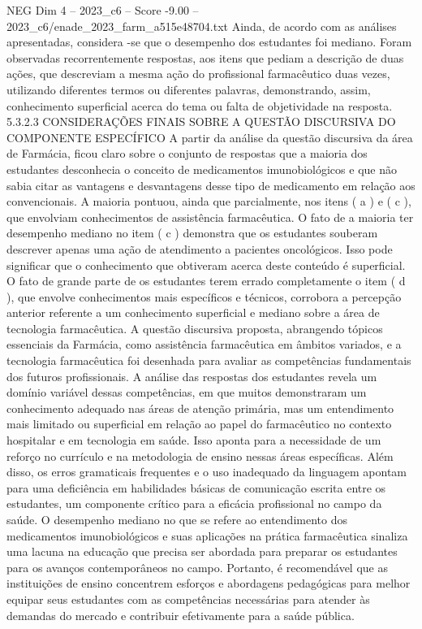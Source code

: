 \begin{textsample}{NEG Dim 4 – 2023\_c6 – Score -9.00 – 2023\_c6/enade\_2023\_farm\_a515e48704.txt}
Ainda, de acordo com as análises apresentadas, considera -se que o desempenho dos estudantes foi mediano.
Foram observadas recorrentemente respostas, aos itens que pediam a descrição de duas ações, que descreviam a mesma ação do profissional farmacêutico duas vezes, utilizando diferentes termos ou diferentes palavras, demonstrando, assim, conhecimento superficial acerca do tema ou falta de objetividade na resposta. 5.3.2.3 CONSIDERAÇÕES FINAIS SOBRE A QUESTÃO DISCURSIVA DO COMPONENTE ESPECÍFICO A partir da análise da questão discursiva da área de Farmácia, ficou claro sobre o conjunto de respostas que a maioria dos estudantes desconhecia o conceito de medicamentos imunobiológicos e que não sabia citar as vantagens e desvantagens desse tipo de medicamento em relação aos convencionais.
A maioria pontuou, ainda que parcialmente, nos itens ( a ) e ( c ), que envolviam conhecimentos de assistência farmacêutica.
O fato de a maioria ter desempenho mediano no item ( c ) demonstra que os estudantes souberam descrever apenas uma ação de atendimento a pacientes oncológicos.
Isso pode significar que o conhecimento que obtiveram acerca deste conteúdo é superficial.
O fato de grande parte de os estudantes terem errado completamente o item ( d ), que envolve conhecimentos mais específicos e técnicos, corrobora a percepção anterior referente a um conhecimento superficial e mediano sobre a área de tecnologia farmacêutica.
A questão discursiva proposta, abrangendo tópicos essenciais da Farmácia, como assistência farmacêutica em âmbitos variados, e a tecnologia farmacêutica foi desenhada para avaliar as competências fundamentais dos futuros profissionais.
A análise das respostas dos estudantes revela um domínio variável dessas competências, em que muitos demonstraram um conhecimento adequado nas áreas de atenção primária, mas um entendimento mais limitado ou superficial em relação ao papel do farmacêutico no contexto hospitalar e em tecnologia em saúde.
Isso aponta para a necessidade de um reforço no currículo e na metodologia de ensino nessas áreas específicas.
Além disso, os erros gramaticais frequentes e o uso inadequado da linguagem apontam para uma deficiência em habilidades básicas de comunicação escrita entre os estudantes, um componente crítico para a eficácia profissional no campo da saúde.
O desempenho mediano no que se refere ao entendimento dos medicamentos imunobiológicos e suas aplicações na prática farmacêutica sinaliza uma lacuna na educação que precisa ser abordada para preparar os estudantes para os avanços contemporâneos no campo.
Portanto, é recomendável que as instituições de ensino concentrem esforços e abordagens pedagógicas para melhor equipar seus estudantes com as competências necessárias para atender às demandas do mercado e contribuir efetivamente para a saúde pública.

\end{textsample}
